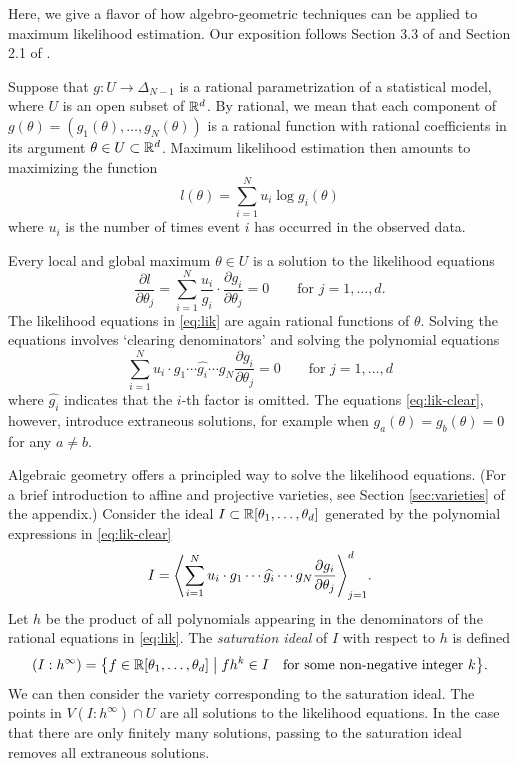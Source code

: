 \documentclass[cclicense]{hmcthesis}
\numberwithin{equation}{section}
\begin{document}
    Here, we give a flavor of how algebro-geometric techniques can be applied to
    maximum likelihood estimation.  Our exposition follows Section 3.3 of
    \citep{ASCB} and Section 2.1 of \citep{DSS08}.

    Suppose that $g: U \to \Delta_{N-1}$ is a rational parametrization of a
    statistical model, where $U$ is an open subset of $\R^d$.  By rational, we
    mean that each component of $g(\theta) = (g_1(\theta), \ldots, g_N(\theta))$
    is a rational function with rational coefficients in its argument $\theta
    \in U \subset \R^d$.  Maximum likelihood estimation then amounts to
    maximizing the function
    \[
        l(\theta) = \sum_{i=1}^N u_i \log g_i(\theta)
    \] 
    where $u_i$ is the number of times event $i$ has occurred in the observed
    data.

    Every local and global maximum $\theta \in U$ is a solution to the
    likelihood equations
    \begin{equation}\label{eq:lik}
        \frac{\partial l}{\partial\theta_j}
        =
        \sum_{i=1}^N 
        \frac{u_i}{g_i} 
        \cdot
        \frac{\partial g_i}{\partial \theta_j}
        = 0
        \qquad
        \text{for $j = 1,\ldots,d$}.
    \end{equation}
    The likelihood equations in \eqref{eq:lik} are again rational functions of
    $\theta$.  Solving the equations involves `clearing denominators' and
    solving the polynomial equations
    \begin{equation}\label{eq:lik-clear}
        \sum_{i=1}^N 
        u_i \cdot g_1 \cdots \widehat{g_i} \cdots g_N
        \frac{\partial g_i}{\partial \theta_j}
        = 0
        \qquad
        \text{for $j = 1, \ldots, d$}
    \end{equation}
    where $\widehat{g_i}$ indicates that the $i$-th factor is omitted.  The
    equations \eqref{eq:lik-clear}, however, introduce extraneous solutions, for
    example when $g_a(\theta) = g_b(\theta) = 0$ for any $a \ne b$.

    Algebraic geometry offers a principled way to solve the likelihood
    equations.  (For a brief introduction to affine and projective varieties, see
    Section \ref{sec:varieties} of the appendix.)  Consider the ideal $I \subset \R[\theta_1,
    \ldots, \theta_d]$ generated by the polynomial expressions in \eqref{eq:lik-clear}
    \[
        I = \adel[\Bigg]{
            \sum_{i=1}^N u_i \cdot g_1 \cdots \widehat{g_i} \cdots g_N
            \frac{\partial g_i}{\partial \theta_j}
        }_{j=1}^d
        .
    \]
    Let $h$ be the product of all polynomials appearing in the denominators of
    the rational equations in \eqref{eq:lik}.  The \emph{saturation ideal} of
    $I$ with respect to $h$ is defined
    \[
        (I : h^\infty) = \cdel[\big]{
            f \in \R[\theta_1, \ldots, \theta_d]
            \;\big\vert\;
            fh^k \in I
            \quad
            \text{for some non-negative integer $k$}
        }.
    \]
    We can then consider the variety corresponding to the saturation ideal.  The
    points in $V(I : h^\infty) \cap U$ are all solutions to the likelihood
    equations.  In the case that there are only finitely many solutions, passing
    to the saturation ideal removes all extraneous solutions.
\end{document}
